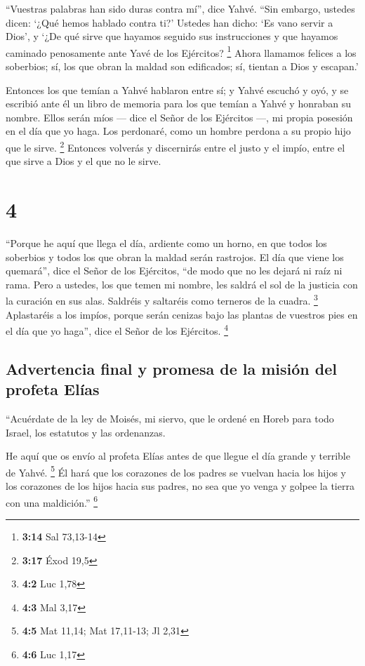  ``Vuestras palabras han sido duras contra mí'', dice
Yahvé. ``Sin embargo, ustedes dicen: `¿Qué hemos hablado contra ti?'
 Ustedes han dicho: `Es vano servir a Dios', y `¿De qué
sirve que hayamos seguido sus instrucciones y que hayamos caminado
penosamente ante Yavé de los Ejércitos? \footnote{\textbf{3:14} Sal
  73,13-14}  Ahora llamamos felices a los soberbios; sí,
los que obran la maldad son edificados; sí, tientan a Dios y escapan.'

 Entonces los que temían a Yahvé hablaron entre sí; y
Yahvé escuchó y oyó, y se escribió ante él un libro de memoria para los
que temían a Yahvé y honraban su nombre.  Ellos serán
míos --- dice el Señor de los Ejércitos ---, mi propia posesión en el
día que yo haga. Los perdonaré, como un hombre perdona a su propio hijo
que le sirve. \footnote{\textbf{3:17} Éxod 19,5} 
Entonces volverás y discernirás entre el justo y el impío, entre el que
sirve a Dios y el que no le sirve.

\hypertarget{section-3}{%
\section{4}\label{section-3}}

 ``Porque he aquí que llega el día, ardiente como un
horno, en que todos los soberbios y todos los que obran la maldad serán
rastrojos. El día que viene los quemará'', dice el Señor de los
Ejércitos, ``de modo que no les dejará ni raíz ni rama. 
Pero a ustedes, los que temen mi nombre, les saldrá el sol de la
justicia con la curación en sus alas. Saldréis y saltaréis como terneros
de la cuadra. \footnote{\textbf{4:2} Luc 1,78} 
Aplastaréis a los impíos, porque serán cenizas bajo las plantas de
vuestros pies en el día que yo haga'', dice el Señor de los Ejércitos.
\footnote{\textbf{4:3} Mal 3,17}

\hypertarget{advertencia-final-y-promesa-de-la-misiuxf3n-del-profeta-eluxedas}{%
\subsection{Advertencia final y promesa de la misión del profeta
Elías}\label{advertencia-final-y-promesa-de-la-misiuxf3n-del-profeta-eluxedas}}

 ``Acuérdate de la ley de Moisés, mi siervo, que le ordené
en Horeb para todo Israel, los estatutos y las ordenanzas.

 He aquí que os envío al profeta Elías antes de que llegue
el día grande y terrible de Yahvé. \footnote{\textbf{4:5} Mat 11,14; Mat
  17,11-13; Jl 2,31}  Él hará que los corazones de los
padres se vuelvan hacia los hijos y los corazones de los hijos hacia sus
padres, no sea que yo venga y golpee la tierra con una maldición.''
\footnote{\textbf{4:6} Luc 1,17}
